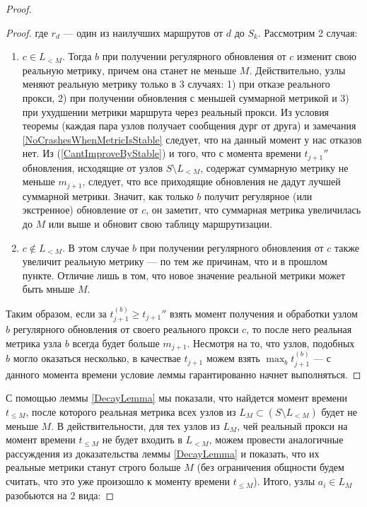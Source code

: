 \documentclass{article}
\theoremstyle{plain}
\theoremstyle{plain}
\theoremstyle{plain}
\theoremstyle{plain}
\theoremstyle{definition}
\theoremstyle{remark}
\theoremstyle{plain}
\begin{document}
\begin{proof}
\begin{proof}
        где $r_d$ --- один из наилучших маршрутов от $d$ до $S_k$. Рассмотрим 2 случая:
        
        \begin{enumerate}
            \item $c \in L_{< M}$. Тогда $b$ при получении регулярного обновления от $c$ изменит свою реальную метрику, причем она станет не меньше $M$. Действительно, узлы меняют реальную метрику только в 3 случаях: 1) при отказе реального прокси, 2) при получении обновления с меньшей суммарной метрикой и 3) при ухудшении метрики маршрута через реальный прокси. Из условия теоремы (каждая пара узлов получает сообщения дург от друга) и замечания \ref{NoCrashesWhenMetricIsStable} следует, что на данный момент у нас отказов нет. Из (\ref{CantImproveByStable}) и того, что с момента времени $t_{j + 1}''$ обновления, исходящие от узлов $S \setminus L_{< M}$, содержат суммарную метрику не меньше $m_{j + 1}$, следует, что все приходящие обновления не дадут лучшей суммарной метрики. Значит, как только $b$ получит регулярное (или экстренное) обновление от $c$, он заметит, что суммарная метрика увеличилась до $M$ или выше и обновит свою таблицу маршрутизации.
            
            \item $c \notin L_{< M}$. В этом случае $b$ при получении регулярного обновления от $c$ также увеличит реальную метрику --- по тем же причинам, что и в прошлом пункте. Отличие лишь в том, что новое значение реальной метрики может быть мньше $M$.
        \end{enumerate}
        
        Таким образом, если за $t_{j + 1}^{(b)} \geq t_{j + 1}''$ взять момент получения и обработки узлом $b$ регулярного обновления от своего реального прокси $c$, то после него реальная метрика узла $b$ всегда будет больше $m_{j + 1}$. Несмотря на то, что узлов, подобных $b$ могло оказаться несколько, в качествае $t_{j + 1}$ можем взять $\displaystyle \max_b t_{j + 1}^{(b)}$ --- с данного момента времени условие леммы гарантированно начнет выполняться.
    \end{proof}
    
    С помощью леммы \ref{DecayLemma} мы показали, что найдется момент времени $t_{\leq M}$, после которого реальная метрика всех узлов из $L_M \subset (S \setminus L_{< M})$ будет не меньше $M$. В действительности, для тех узлов из $L_M$, чей реальный прокси на момент времени $t_{\leq M}$ не будет входить в $L_{< M}$, можем провести аналогичные рассуждения из доказательства леммы \ref{DecayLemma} и показать, что их реальные метрики станут строго больше $M$ (без ограничения общности будем считать, что это уже произошло к моменту времени $t_{\leq M}$). Итого, узлы $a_i \in L_M$ разобьются на 2 вида:
    

\end{proof}
\end{document}
